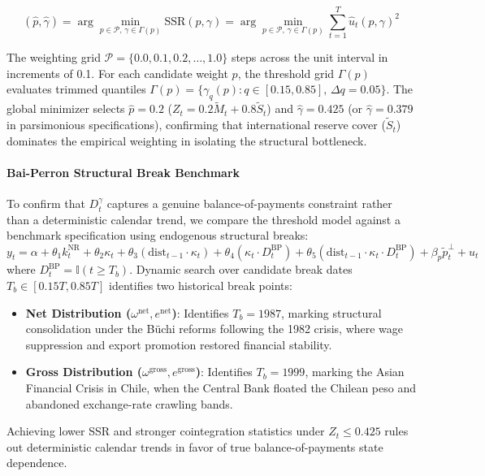\begin{equation}
	(\hat{p}, \hat{\gamma}) = \arg\min_{p \in \mathcal{P}, \, \gamma \in \Gamma(p)} \text{SSR}(p, \gamma) = \arg\min_{p \in \mathcal{P}, \, \gamma \in \Gamma(p)} \sum_{t=1}^{T} \hat{u}_t(p, \gamma)^2
\end{equation}

The weighting grid $\mathcal{P} = \{ 0.0, 0.1, 0.2, \dots, 1.0 \}$ steps across the unit interval in increments of 0.1. For each candidate weight $p$, the threshold grid $\Gamma(p)$ evaluates trimmed quantiles $\Gamma(p) = \{ \gamma_q(p) : q \in [0.15, 0.85], \, \Delta q = 0.05 \}$. The global minimizer selects $\hat{p} = 0.2$ ($Z_t = 0.2 \tilde{M}_t + 0.8 \tilde{S}_t$) and $\hat{\gamma} = 0.425$ (or $\hat{\gamma} = 0.379$ in parsimonious specifications), confirming that international reserve cover ($\tilde{S}_t$) dominates the empirical weighting in isolating the structural bottleneck.

\paragraph{Bai-Perron Structural Break Benchmark}
To confirm that $D_t^{\gamma}$ captures a genuine balance-of-payments constraint rather than a deterministic calendar trend, we compare the threshold model against a benchmark specification using \citet{BaiPerron2003} endogenous structural breaks:
\begin{equation}
	y_t = \alpha + \theta_1 k_t^{\text{NR}} + \theta_2 \kappa_t + \theta_3 (\text{dist}_{t-1} \cdot \kappa_t) + \theta_4 (\kappa_t \cdot D_t^{\text{BP}}) + \theta_5 (\text{dist}_{t-1} \cdot \kappa_t \cdot D_t^{\text{BP}}) + \beta_p \tilde{p}_t^\perp + u_t
\end{equation}
where $D_t^{\text{BP}} = \mathbb{I}(t \ge T_b)$. Dynamic search over candidate break dates $T_b \in [0.15 T, 0.85 T]$ identifies two historical break points:
\begin{itemize}
	\item \textbf{Net Distribution ($\omega^{\text{net}}, e^{\text{net}}$)}: Identifies $T_b = 1987$, marking structural consolidation under the Büchi reforms following the 1982 crisis, where wage suppression and export promotion restored financial stability.
	\item \textbf{Gross Distribution ($\omega^{\text{gross}}, e^{\text{gross}}$)}: Identifies $T_b = 1999$, marking the Asian Financial Crisis in Chile, when the Central Bank floated the Chilean peso and abandoned exchange-rate crawling bands.
\end{itemize}
Achieving lower SSR and stronger cointegration statistics under $Z_t \le 0.425$ rules out deterministic calendar trends in favor of true balance-of-payments state dependence.

